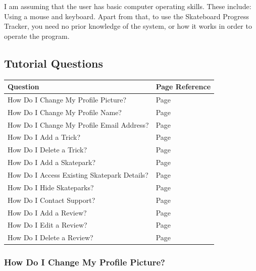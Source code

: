 I am assuming that the user has basic computer operating skills. These include: Using a mouse and keyboard. Apart from that, to use the Skateboard Progress Tracker, you need no prior knowledge of the system, or how it works in order to operate the program.

\subsection{Tutorial Questions}

\begin{center}
\begin{tabular}{|p{6cm}|p{2cm}|}
    \hline
 \textbf{Question} & \textbf{Page Reference} \\ \hline
How Do I Change My Profile Picture? & Page \pageref{ChangePic} \\ \hline
How Do I Change My Profile Name? & Page \pageref{ChangeName} \\ \hline
How Do I Change My Profile Email Address? & Page \pageref{ChangeEmail} \\ \hline
How Do I Add a Trick? & Page \pageref{AddTrick} \\ \hline
How Do I Delete a Trick? & Page \pageref{DeleteTrick} \\ \hline
How Do I Add a Skatepark? & Page \pageref{AddSkatepark} \\ \hline
How Do I Access Existing Skatepark Details? & Page \pageref{SkateparkDetails} \\ \hline
How Do I Hide Skateparks? & Page \pageref{HideSkatepark} \\ \hline
How Do I Contact Support? & Page \pageref{ContactSupport}\\ \hline
How Do I Add a Review? & Page \pageref{AddReview} \\ \hline
How Do I Edit a Review? & Page \pageref{EditReview} \\ \hline
How Do I Delete a Review? & Page \pageref{DeleteReview} \\ \hline


\end{tabular}
\label{tab:Tutorial Question List}
\end{center}

\subsubsection{How Do I Change My Profile Picture?} \label{ChangePic}

